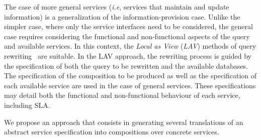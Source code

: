 The case of more general services (\textit{i.e}, services that maintain and update information) is a generalization of the information-provision case.
Unlike the simpler case, where only the service interfaces need to be considered, the general case requires considering the functional and non-functional aspects of the query and available services.
In this context, the \textit{Local as View} (\textit{LAV}) methods of query rewriting~\cite{Levy2000} are suitable.
In the LAV approach, the rewriting process is guided by the specification of both the query to be rewritten and the available databases.
The specification of the composition to be produced as well as the specification of each available service are used in the case of general services.
These specifications may detail both the functional and non-functional behaviour of each service, including SLA.


We propose an approach that consists in generating several translations of an abstract service specification into compositions
over concrete  services. 



